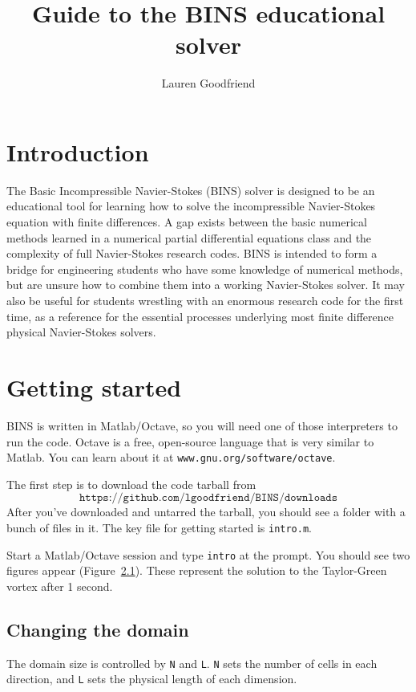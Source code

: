 \documentclass[12pt]{article}
\author{Lauren Goodfriend}
\title{Guide to the BINS educational solver}
\begin{document}
\maketitle
\tableofcontents

\section{Introduction}

The Basic Incompressible Navier-Stokes (BINS) solver is designed to be an educational tool for learning how to solve the incompressible Navier-Stokes equation with finite differences.  A gap exists between the basic numerical methods learned in a numerical partial differential equations class and the complexity of full Navier-Stokes research codes.  BINS is intended to form a bridge for engineering students who have some knowledge of numerical methods, but are unsure how to combine them into a working Navier-Stokes solver.  It may also be useful for students wrestling with an enormous research code for the first time, as a reference for the essential processes underlying most finite difference physical Navier-Stokes solvers.

\section{Getting started}

BINS is written in Matlab/Octave, so you will need one of those interpreters to run the code.  Octave is a free, open-source language that is very similar to Matlab.  You can learn about it at \texttt{www.gnu.org/software/octave}.

The first step is to download the code tarball from \[ \texttt{https://github.com/lgoodfriend/BINS/downloads}\]  After you've downloaded and untarred the tarball, you should see a folder with a bunch of files in it.  The key file for getting started is \texttt{intro.m}.

Start a Matlab/Octave session and type \texttt{intro} at the prompt.  You should see two figures appear (Figure~\ref{}).  These represent the solution to the Taylor-Green vortex after 1 second.

\subsection{Changing the domain}
The domain size is controlled by \texttt{N} and \texttt{L}.  \texttt{N} sets the number of cells in each direction, and \texttt{L} sets the physical length of each dimension.
\end{document}
